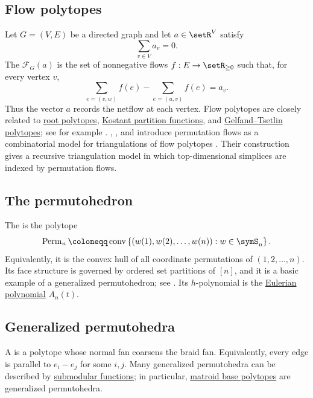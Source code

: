 \subsection[flowPolytope]{Flow polytopes}

Let $G=(V,E)$ be a directed graph and let $a\in\setR^V$ satisfy
\[
  \sum_{v\in V} a_v=0.
\]
The \label{flowPolytopeDefinition}
$\mathcal{F}_G(a)$ is the set of nonnegative
flows $f:E\to\setR_{\geq 0}$ such that, for every vertex $v$,
\[
  \sum_{e=(v,w)} f(e)-\sum_{e=(u,v)} f(e)=a_v.
\]
Thus the vector $a$ records the netflow at each vertex.  Flow polytopes are
closely related to \hyperref[rootPolytopeDefinition]{root polytopes},
\hyperref[kostantPartitionFunction]{Kostant partition functions}, and
\hyperref[gtpolytopes]{Gelfand--Tsetlin polytopes}; see for example
\cite{LiuMeszarosDizier2019flow}.
,
, and  introduce permutation
flows as a combinatorial model for triangulations of flow polytopes
\cite{DLeonHanusaYip2025x}.  Their construction gives a recursive
triangulation model in which top-dimensional simplices are indexed by
permutation flows.


\subsection[permutohedron]{The permutohedron}

The \label{permutohedronDefinition} is the polytope
\[
  \operatorname{Perm}_n
  \coloneqq
  \operatorname{conv}
  \left\{ (w(1),w(2),\dotsc,w(n)) : w\in\symS_n \right\}.
\]
Equivalently, it is the convex hull of all coordinate permutations of
$(1,2,\dotsc,n)$.  Its face structure is governed by ordered set partitions
of $[n]$, and it is a basic example of a generalized permutohedron; see
\cite{ZieglerLecturesOnPolytopes95}.  Its $h$-polynomial is the
\hyperref[eulerianGeometry]{Eulerian polynomial} $A_n(t)$.


\subsection[generalizedPermutohedron]{Generalized permutohedra}

A \label{generalizedPermutohedronDefinition}
is a polytope whose normal fan coarsens the
braid fan.  Equivalently, every edge is parallel to $e_i-e_j$ for some
$i,j$.  Many generalized permutohedra can be described by
\hyperref[submodularFunction]{submodular functions}; in particular,
\hyperref[matroidBasePolytope]{matroid base polytopes} are generalized
permutohedra.


